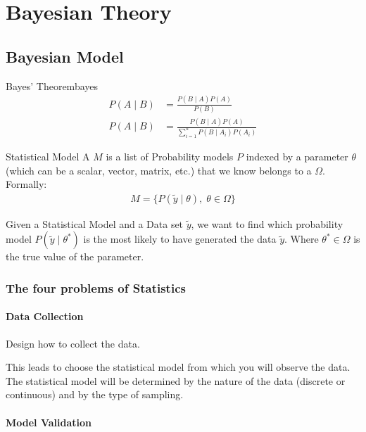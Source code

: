 \chapter{Bayesian Theory}
\section{Bayesian Model}

\begin{theorem}{Bayes' Theorem}{bayes}
	\begin{align}
		P(A \mid B) & = \frac{P(B \mid A)P(A)}{P(B)}                             \\
		P(A \mid B) & = \frac{P(B \mid A)P(A)}{\sum_{i=1}^n P(B \mid A_i)P(A_i)}
	\end{align}
\end{theorem}

\begin{definition}{Statistical Model}{}
	A  $M$ is a list of Probability models $P$ indexed by
	a parameter $\theta$ (which can be a scalar, vector, matrix, etc.) that
	we know belongs to a  $\Omega$.
	\\[1em]
	Formally:
	\begin{align}
		M = \{ P(\tilde{y}\mid\theta), \; \theta \in \Omega \}
	\end{align}
\end{definition}

Given a Statistical Model and a Data set $\tilde{y}$, we want to find
which probability model $P(\tilde{y}\mid\theta^*)$ is the most likely to
have generated the data $\tilde{y}$. Where $\theta^* \in \Omega$ is the true
value of the parameter.

\subsection{The four problems of Statistics}
\subsubsection{Data Collection}
Design how to collect the data.

This leads to choose the statistical model from which you will observe the data.
The statistical model will be determined by the nature of the data
(discrete or continuous) and by the type of sampling.

\subsubsection{Model Validation}

